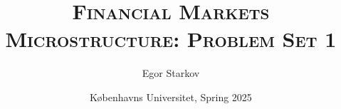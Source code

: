 \documentclass[11pt
, answers
]{exam}
\begin{document}
\title{\textsc{Financial Markets Microstructure: Problem Set 1}}
\date{K{\o}benhavns Universitet, Spring 2025}
\author{Egor Starkov}


\maketitle





%
%
%
\end{document}
